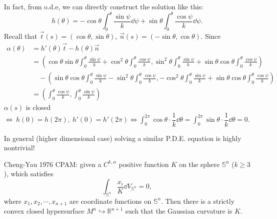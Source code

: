 In fact, from o.d.e, we can directly construct the solution like this:
\[
    h(\theta)=-\cos\theta \int_0^\theta \frac{\sin \psi}{k}\dd \psi
    +\sin\theta \int_0^\theta \frac{\cos \psi}{k}\dd \psi  
.\]
Recall that $\vec{t}(s)=(\cos\theta,\sin\theta),~\vec{n}(s)=(-\sin \theta,\cos\theta).$
Since
\begin{align*}
    \alpha(\theta)&=h'(\theta)\vec{t}-h(\theta)\vec{n}\\
    &=\left(
        \cos\theta\sin\theta\int_0^\theta\frac{\sin\psi}{k}
        +\cos^2\theta\int_0^\theta\frac{\cos\psi}{k},
        \sin^2\theta\int_0^\theta\frac{\sin\psi}{k}
        +\sin\theta\cos\theta\int_0^\theta\frac{\cos\psi}{k}
    \right)\\
    &\quad-\left( 
        \sin\theta\cos\theta\int_0^\theta\frac{\sin\psi}{k}
        -\sin^2\theta\int_0^\theta\frac{\cos\psi}{k},
        -\cos^2\theta\int_0^\theta\frac{\sin\psi}{k}
        +\sin\theta\cos\theta\int_0^\theta\frac{\cos\psi}{k}
    \right)\\
    &=\left(
        \int_0^\theta\frac{\cos\psi}{k},
        \int_0^\theta\frac{\sin\psi}{k}
    \right)
\end{align*}
$\alpha(s)$ is closed $\Leftrightarrow~h(0)=h(2\pi),~h'(0)=h'(2\pi)
\Leftrightarrow \int_0^{2\pi}\cos\theta\cdot\dfrac{1}{k}\dd \theta
=\int_0^{2\pi}\sin\theta\cdot\dfrac{1}{k}\dd \theta
=0$.
\begin{remark}
    In general (higher dimensional case) solving a similar P.D.E. equation is highly nontrivial!
    
    Cheng-Yau 1976 CPAM: given a $C^{k,\alpha}$ positive function $K$ on the
    sphere $\mathbb{S}^n$ ($k\ge 3$), which satisfies
    \[
    \int_{\mathbb{S}^n}\frac{x_i}{K}\dd V_{\mathbb{S}^n}=0
    ,\]
    where $x_1,x_2,\cdots,x_{n+1}$ are coordinate functions on 
    $\mathbb{S}^n$. 
    Then there is a strictly convex closed 
    hypersurface $M^n \hookrightarrow \mathbb{R}^{n+1}$ such
    that the Gaussian curvature is $K$.
\end{remark} 
